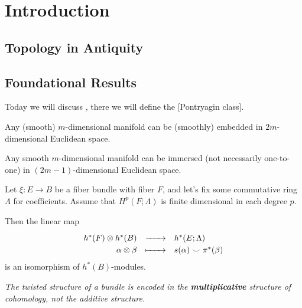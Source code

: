 \chapter{Introduction}\label{chapter:introduction}

\section{Topology in Antiquity}


\section{Foundational Results}

Today we will discuss \cite{dieck2008algebraic}, there we will define the [Pontryagin class].

\begin{theorem}
  Any (smooth) $m$-dimensional manifold can be (smoothly) embedded in $2m$-dimensional Euclidean space.
\end{theorem}

\begin{theorem}
  Any smooth $m$-dimensional manifold can be immersed (not necessarily one-to-one) in $(2m-1)$-dimensional Euclidean space.
\end{theorem}

\begin{theorem}
  Let $\xi : E \to B$ be a fiber bundle with fiber $F$, and let's fix some commutative ring $\Lambda$ for coefficients. Assume that $H^p(F;\Lambda)$ is finite dimensional in each degree $p$. 

  Then the linear map
  \[
    \definefunction{}{h^*(F)\otimes h^*(B)}{h^*(E; \Lambda)}{\alpha\otimes \beta}{s(\alpha)\smile \pi^*(\beta)}
  \]
  is an isomorphism of $h^*(B)$-modules.
\end{theorem}

\begin{center}
  \emph{The twisted structure of a bundle is encoded in the \textbf{multiplicative} structure of cohomology, not the additive structure.}
\end{center}
